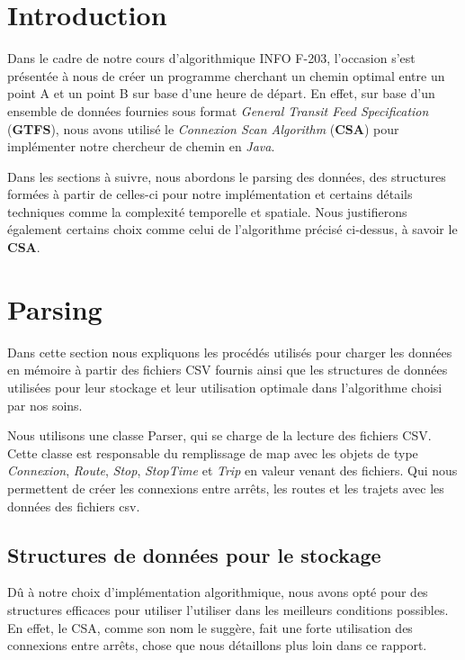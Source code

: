 \documentclass[12pt]{article}
\begin{document}
\clearpage


\tableofcontents

\newpage


\section{Introduction}
Dans le cadre de notre cours d'algorithmique INFO F-203, l'occasion s'est présentée à nous de créer un programme cherchant un chemin optimal
entre un point A et un point B sur base d'une heure de départ. En effet, sur base d'un ensemble de données
fournies sous format \emph{General Transit Feed Specification} (\textbf{GTFS}), nous avons utilisé le \emph{Connexion Scan Algorithm} (\textbf{CSA})
pour implémenter notre chercheur de chemin en \emph{Java}. 

Dans les sections à suivre, nous abordons le parsing des données, des structures formées à partir de celles-ci pour notre
implémentation et certains détails techniques comme la complexité temporelle et spatiale. Nous justifierons également certains choix
comme celui de l'algorithme précisé ci-dessus, à savoir le \textbf{CSA}.


\section{Parsing}
Dans cette section nous expliquons les procédés utilisés pour charger les données en mémoire à partir des fichiers CSV fournis ainsi que
les structures de données utilisées pour leur stockage et leur utilisation optimale dans l'algorithme choisi par nos soins.

Nous utilisons une classe Parser, qui se charge de la lecture des fichiers CSV.
Cette classe est responsable du remplissage de map avec les objets de type \emph{Connexion}, \emph{Route}, \emph{Stop}, \emph{StopTime} et \emph{Trip} en valeur venant des fichiers.
Qui nous permettent de créer les connexions entre arrêts, les routes et les trajets avec les données des fichiers csv.

\subsection{Structures de données pour le stockage}
Dû à notre choix d'implémentation algorithmique, nous avons opté pour des structures efficaces pour utiliser l'utiliser dans
les meilleurs conditions possibles. En effet, le CSA, comme son nom le suggère, fait une forte utilisation des connexions entre arrêts,
chose que nous détaillons plus loin dans ce rapport.
\end{document}
